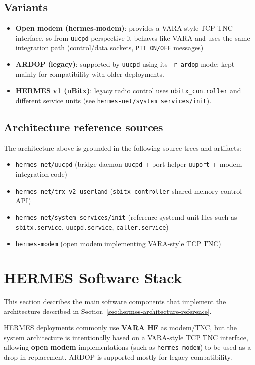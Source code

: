 \subsection{Variants}
\begin{itemize}
\item \textbf{Open modem (hermes-modem)}: provides a VARA-style TCP TNC interface, so from \verb|uucpd| perspective it behaves like VARA and
  uses the same integration path (control/data sockets, \verb|PTT ON/OFF| messages).
\item \textbf{ARDOP (legacy)}: supported by \verb|uucpd| using its \verb|-r ardop| mode; kept mainly for compatibility with older deployments.
\item \textbf{HERMES v1 (uBitx)}: legacy radio control uses \verb|ubitx_controller| and different service units (see \verb|hermes-net/system_services/init|).
\end{itemize}

\subsection{Architecture reference sources}
\label{sec:hermes-architecture-refs}

The architecture above is grounded in the following source trees and artifacts:
\begin{itemize}
\item \verb|hermes-net/uucpd| (bridge daemon \verb|uucpd| + port helper \verb|uuport| + modem integration code)
\item \verb|hermes-net/trx_v2-userland| (\verb|sbitx_controller| shared-memory control API)
\item \verb|hermes-net/system_services/init| (reference systemd unit files such as \verb|sbitx.service|, \verb|uucpd.service|, \verb|caller.service|)
\item \verb|hermes-modem| (open modem implementing VARA-style TCP TNC)
\end{itemize}


\section{HERMES Software Stack}

This section describes the main software components that implement the architecture described in
Section~\ref{sec:hermes-architecture-reference}.

HERMES deployments commonly use \textbf{VARA HF} as modem/TNC, but the system architecture is intentionally based on a
VARA-style TCP TNC interface, allowing \textbf{open modem} implementations (such as \verb|hermes-modem|) to be used as a drop-in
replacement. ARDOP is supported mostly for legacy compatibility.

